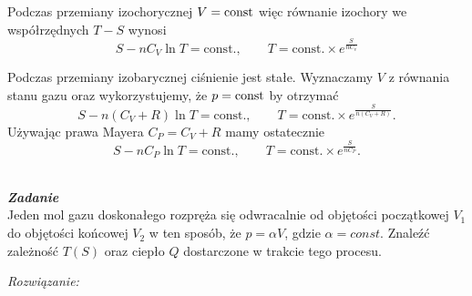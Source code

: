\documentclass[11pt,a4paper]{article}
\newcounter{zadanie}\newcommand{\zadanie}[1][]{\addtocounter{zadanie}{1} ~\\  {\bf \emph{Zadanie \arabic{zadanie} #1 }} \\}
\begin{document}
Podczas przemiany izochorycznej $V = {\rm const}$ więc równanie izochory we współrzędnych $T-S$ wynosi
\begin{equation}
	S - n C_V \ln T =\text{const.}, \qquad T = \text{const.} \times e^\frac{S}{nC_v}
\end{equation}

Podczas przemiany izobarycznej ciśnienie jest stałe. Wyznaczamy $V$ z równania stanu gazu oraz wykorzystujemy, że $p = {\rm const}$ by otrzymać
\begin{equation}
	S  - n (C_V +R) \ln T = \text{const.}, \qquad T = \text{const.} \times e^\frac{S}{n(C_V+R)}.
\end{equation}
Używając prawa Mayera $C_P=C_V+R$ mamy ostatecznie
\begin{equation}
	S  - n C_P \ln T = \text{const.}, \qquad T = \text{const.} \times e^\frac{S}{nC_P}.
\end{equation}
\newpage

\zadanie
Jeden mol gazu doskonałego rozpręża się odwracalnie od objętości początkowej $V_1$ do objętości końcowej $V_2$ w ten sposób, że $p = \alpha V$, gdzie $\alpha=const$. Znaleźć zależność $T(S)$ oraz ciepło $Q$ dostarczone w trakcie tego procesu.

\vspace{5mm}
{\em Rozwiązanie:}
\end{document}
